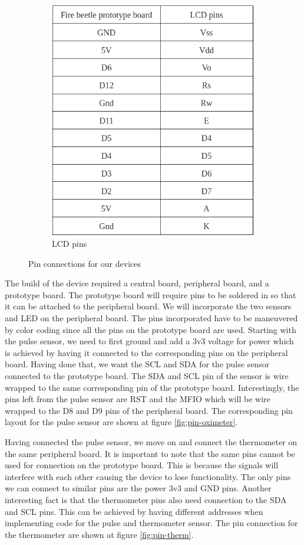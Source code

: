 \documentclass[10pt, conference]{IEEEtran}
\begin{document}
\begin{figure}[t]
\begin{subfigure}[b]{.3\linewidth}
        \includegraphics[width=.9\linewidth]{resources/pin-lcd.png}
        \caption{LCD pins}
        \label{fig:pin-lcd}
    \end{subfigure}
    \label{fig:pins}
    \caption{Pin connections for our devices}
\end{figure}
The build of the device required a central board, peripheral board, and a prototype board. The prototype board will require pins to be soldered in so that it can be attached to the peripheral board. We will incorporate the two sensors and LED on the peripheral board. The pins incorporated have to be maneuvered by color coding since all the pins on the prototype board are used. Starting with the pulse sensor, we need to first ground and add a 3v3 voltage for power which is achieved by having it connected to the corresponding pins on the peripheral board. Having done that, we want the SCL and SDA for the pulse sensor connected to the prototype board. The SDA and SCL pin of the sensor is wire wrapped to the same corresponding pin of the prototype board. Interestingly, the pins left from the pulse sensor are RST and the MFIO which will be wire wrapped to the D8 and D9 pins of the peripheral board. The corresponding pin layout for the pulse sensor are shown at figure \ref{fig:pin-oximeter}.

Having connected the pulse sensor, we move on and connect the thermometer on the same peripheral board. It is important to note that the same pins cannot be used for connection on the prototype board. This is because the signals will interfere with each other causing the device to lose functionality. The only pins we can connect to similar pins are the power 3v3 and GND pins. Another interesting fact is that the thermometer pins also need connection to the SDA and SCL pins. This can be achieved by having different addresses when implementing code for the pulse and thermometer sensor. The pin connection for the thermometer are shown at figure \ref{fig:pin-therm}.
\end{document}
